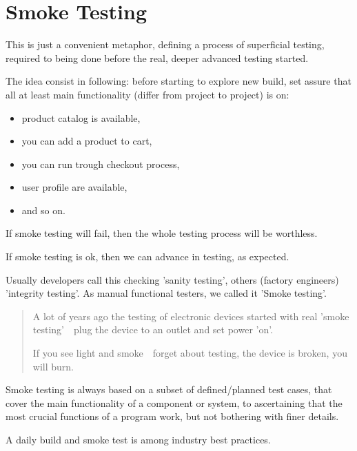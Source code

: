 \section{Smoke Testing}
\label{sec:Smoke Testing}

This is just a convenient metaphor, defining a process of superficial testing, required to being done before the real, deeper advanced testing started.

The idea consist in following: before starting to explore new build, set assure that all at least main functionality (differ from project to project) is on:

    \begin{itemize}
\item 
product catalog is available,
\item     you can add a product to cart,
\item     you can run trough checkout process,
\item     user profile are available,
\item     and so on.              \end{itemize}

If smoke testing will fail, then the whole testing process will be worthless.

If smoke testing is ok, then we can advance in testing, as expected.

Usually developers call this checking 'sanity testing', others (factory engineers) 'integrity testing'. As manual functional testers, we called it 'Smoke testing'.

\begin{quote}
A lot of years ago the testing of electronic devices started with real 'smoke testing'~\textemdash~plug the device to an outlet and set power 'on'.

If you see light and smoke~\textemdash~forget about testing, the device is broken, you will burn.                                                                        \end{quote} 

Smoke testing is always based on a subset of defined/planned test cases, that cover the main functionality of a component or system, to ascertaining that the most crucial functions of a program work, but not bothering with finer details.

A daily build and smoke test is among industry best practices.

